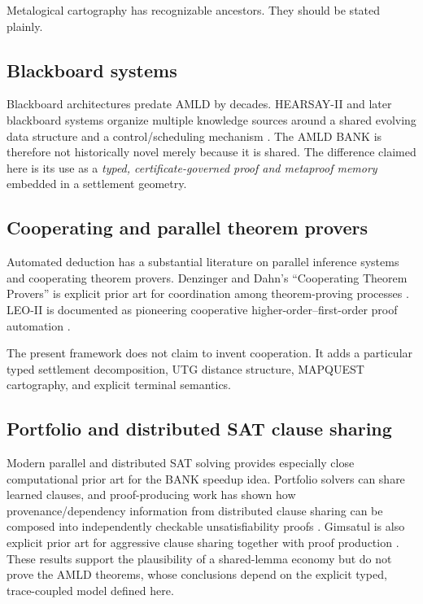 \documentclass[11pt]{article}
\begin{document}
Metalogical cartography has recognizable ancestors. They should be stated plainly.

\subsection{Blackboard systems}

Blackboard architectures predate AMLD by decades. HEARSAY-II and later blackboard systems organize multiple knowledge sources around a shared evolving data structure and a control/scheduling mechanism \cite{Nii}. The AMLD BANK is therefore not historically novel merely because it is shared. The difference claimed here is its use as a \emph{typed, certificate-governed proof and metaproof memory} embedded in a settlement geometry.

\subsection{Cooperating and parallel theorem provers}

Automated deduction has a substantial literature on parallel inference systems and cooperating theorem provers. Denzinger and Dahn's ``Cooperating Theorem Provers'' is explicit prior art for coordination among theorem-proving processes \cite{DenzingerDahn}. LEO-II is documented as pioneering cooperative higher-order--first-order proof automation \cite{LEOII}.

The present framework does not claim to invent cooperation. It adds a particular typed settlement decomposition, UTG distance structure, MAPQUEST cartography, and explicit terminal semantics.

\subsection{Portfolio and distributed SAT clause sharing}

Modern parallel and distributed SAT solving provides especially close computational prior art for the BANK speedup idea. Portfolio solvers can share learned clauses, and proof-producing work has shown how provenance/dependency information from distributed clause sharing can be composed into independently checkable unsatisfiability proofs \cite{Michaelson2025}. Gimsatul is also explicit prior art for aggressive clause sharing together with proof production \cite{Gimsatul}. These results support the plausibility of a shared-lemma economy but do not prove the AMLD theorems, whose conclusions depend on the explicit typed, trace-coupled model defined here.
\end{document}
